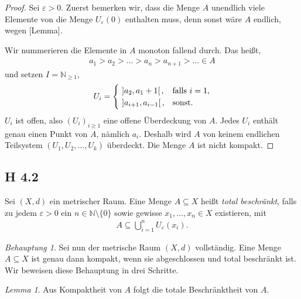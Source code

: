\documentclass[draft,a5paper]{article}
\theoremstyle{remark}
\newtheorem*{beh}{Behauptung}
\newtheorem*{lem}{Lemma}
\newcommand{\interval}[1]{\mathinner{#1}}
\begin{document}
\begin{proof}
  Sei \(\varepsilon > 0\). Zuerst bemerken wir, dass die Menge \(A\) unendlich
  viele Elemente von die Menge \(U_{\varepsilon}(0)\) enthalten muss, denn sonst
  wäre \(A\) endlich, wegen [Lemma].

  Wir nummerieren die Elemente in \(A\) monoton fallend durch.  Das
  heißt,
  \begin{align*}
    a_{1} > a_{2} >  \ldots > a_{n} > a_{n+1} > \ldots  \in A
  \end{align*}
  und setzen \(I = \mathbb{N}_{\ge 1}\),
  \begin{align*}
    U_{i} =
    \begin{cases}
      ~ \interval{]a_{2}, a_{1} + 1[}, & \text{falls } i = 1, \\
      ~ \interval{]a_{i + 1}, a_{i - 1}[}, & \text{sonst.}
    \end{cases}
  \end{align*}
  \(U_{i}\) ist offen, also \((U_{i})_{i \ge 1}\) eine offene
  Überdeckung von \(A\).  Jedes \(U_{i}\) enthält genau einen Punkt
  von \(A\), nämlich \(a_{i}\).  Deshalb wird \(A\) von keinem
  endlichen Teilsystem \((U_{1}, U_{2}, \ldots, U_{k})\) überdeckt.  Die
  Menge \(A\) ist nicht kompakt.
\end{proof}

\subsection*{H 4.2}

Sei \((X, d)\) ein metrischer Raum.  Eine Menge \(A \subseteq X\) heißt
\textit{total beschränkt}, falls zu jedem \(\varepsilon > 0\) ein \(n \in \mathbb{N} \setminus
\{0\}\) sowie gewisse \(x_{1}, \ldots, x_{n} \in X\) existieren, mit
\begin{align*}
  A \subseteq \bigcup_{i = 1}^{n}{U_{\varepsilon}(x_{i})}.
\end{align*}

\begin{beh}
  Sei nun der metrische Raum \((X, d)\) vollständig.  Eine Menge
  \(A \subseteq X\) ist genau dann kompakt, wenn sie abgeschlossen und total
  beschränkt ist. Wir beweisen diese Behauptung in drei Schritte.
\end{beh}

\begin{lem}
  Aus Kompaktheit von \(A\) folgt die totale Beschränktheit von \(A\).
\end{lem}
\end{document}
